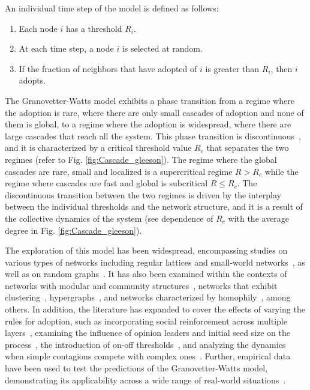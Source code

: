 \begin{theorem}
    \sffamily\small
    An individual time step of the model is defined as follows:
    \begin{enumerate}
        \item Each node $i$ has a threshold $R_i$.
        \item At each time step, a node $i$ is selected at random.
        \item If the fraction of neighbors that have adopted of $i$ is greater than $R_i$, then $i$ adopts.
    \end{enumerate}
\end{theorem}

The Granovetter-Watts model exhibits a phase transition from a regime where the adoption is rare, where there are only small cascades of adoption and none of them is global, to a regime where the adoption is widespread, where there are large cascades that reach all the system. This phase transition is discontinuous~\cite{watts-2002,gleeson-2007}, and it is characterized by a critical threshold value $R_c$ that separates the two regimes (refer to Fig. \ref{fig:Cascade_gleeson}). The regime where the global cascades are rare, small and localized is a supercritical regime $R > R_c$ while the regime where cascades are fast and global is subcritical $R \leq R_c$. The  discontinuous transition between the two regimes is driven by the interplay between the individual thresholds and the network structure, and it is a result of the collective dynamics of the system (see dependence of $R_c$ with the average degree in Fig. \ref{fig:Cascade_gleeson}).

The exploration of this model has been widespread, encompassing studies on various types of networks including regular lattices and small-world networks~\cite{centola-2007}, as well as on random graphs~\cite{gleeson-2007}. It has also been examined within the contexts of networks with modular and community structures~\cite{gleeson-2008}, networks that exhibit clustering~\cite{hackett-2011,hackett-2013}, hypergraphs~\cite{de-arruda-2020}, and networks characterized by homophily~\cite{diaz-diaz-2022}, among others. In addition, the literature has expanded to cover the effects of varying the rules for adoption, such as incorporating social reinforcement across multiple layers~\cite{chen-2018}, examining the influence of opinion leaders and initial seed size on the process~\cite{liu-2018, singh-2013}, the introduction of on-off thresholds~\cite{dodds-2013}, and analyzing the dynamics when simple contagions compete with complex ones~\cite{czaplicka-2016, min-2018, diaz-diaz-2022}. Further, empirical data have been used to test the predictions of the Granovetter-Watts model, demonstrating its applicability across a wide range of real-world situations~\cite{centola-2010, karimi-2013, karsai-2014, rosenthal-2015, karsai-2016, mnsted-2017, unicomb-2018, guilbeault-2021}.


